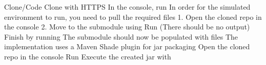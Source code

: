 \markdownRendererDocumentBegin
\markdownRendererSectionBegin
\markdownRendererSectionBegin
{}\markdownRendererInterblockSeparator
{}\markdownRendererSectionBegin
{}\markdownRendererInterblockSeparator
{}\markdownRendererOlBeginTight
{}Clone/Code\markdownRendererOlItemEnd 
{}Clone with HTTPS\markdownRendererOlItemEnd 
{}In the console, run \markdownRendererOlItemEnd 
\markdownRendererOlEndTight \markdownRendererInterblockSeparator
{}
\markdownRendererSectionEnd \markdownRendererSectionBegin
{}\markdownRendererInterblockSeparator
{}In order for the simulated environment to run, you need to pull the required files 1. Open the cloned repo in the console 2. Move to the submodule using \markdownRendererInterblockSeparator
{}\markdownRendererOlBegin
{}Run  (There should be no output)\markdownRendererOlItemEnd 
{}Finish by running \markdownRendererOlItemEnd 
{}The  submodule should now be populated with  files\markdownRendererOlItemEnd 
\markdownRendererOlEnd \markdownRendererInterblockSeparator
{}
\markdownRendererSectionEnd 
\markdownRendererSectionEnd \markdownRendererSectionBegin
{}\markdownRendererInterblockSeparator
{}The implementation uses a Maven Shade plugin for jar packaging\markdownRendererInterblockSeparator
{}\markdownRendererOlBeginTight
{}Open the cloned repo in the console\markdownRendererOlItemEnd 
{}Run \markdownRendererOlItemEnd 
{}Execute the created jar with \markdownRendererInterblockSeparator
{}\markdownRendererUlBeginTight
